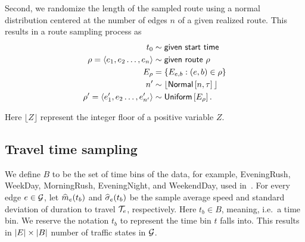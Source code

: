 \documentclass[12pt]{article}
\begin{document}
{{{{{{Second, we randomize the length of the sampled route using a normal distribution centered at the number of edges $n$ of a given realized route. This results in a route sampling process as
\begin{equation} \label{eq:route_sampling}
\begin{aligned}
    t_0 & \sim \textsf{given start time} \\
    \rho = \langle e_1, e_2 \dots, e_n \rangle & \sim \textsf{given route } \rho \\
    E_{\rho} &= \left\{E_{e, b}: (e,b) \in \rho \right\}\\
    n'& \sim {\lfloor}\textsf{Normal}\left[n, \tau\right]{\rfloor}\\
    \rho' = \langle e'_1, e_2 \dots, e'_{n'} \rangle & \sim \textsf{Uniform}\left[E_\rho\right]. 
\end{aligned}
\end{equation}

Here $ {\lfloor} Z {\rfloor}$ represent the integer floor of a positive variable $Z$.   

\subsection{Travel time sampling}\label{sec:travel time sampling}
We define $B$ to be the set of time bins of the data, for example, EveningRush, WeekDay, MorningRush, EveningNight, and WeekendDay, used in~\cite{elmasri2020predictive}. For every edge $e \in \mathcal{G}$, let ${\widehat m}_e(t_b)$ and ${\widehat \sigma}_e(t_b)$ be the sample average speed and standard deviation of duration to travel $\mathcal{T}_e$, respectively. Here $t_b \in B$, meaning, i.e.~a time bin. We reserve the notation $t_b$ to represent the time bin $t$ falls into. This results in $\left|E\right| \times \left|B\right|$ number of traffic states in $\mathcal{G}$. 

}}}}}}
\end{document}
